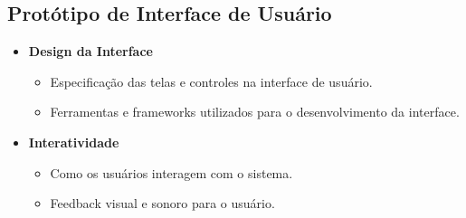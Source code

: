     \subsection{Protótipo de Interface de Usuário}
    
    \begin{itemize}
        \item \textbf{Design da Interface}
        \begin{itemize}
            \item Especificação das telas e controles na interface de usuário.
            \item Ferramentas e frameworks utilizados para o desenvolvimento da interface.
        \end{itemize}
        
        \item \textbf{Interatividade}
        \begin{itemize}
            \item Como os usuários interagem com o sistema.
            \item Feedback visual e sonoro para o usuário.
        \end{itemize}
    \end{itemize}